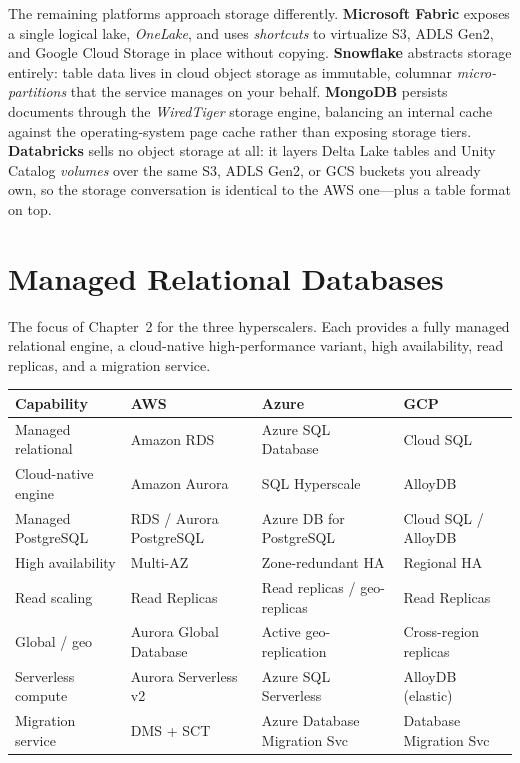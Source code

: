 \noindent The remaining platforms approach storage differently.
\textbf{Microsoft Fabric} exposes a single logical lake, \emph{OneLake}, and uses
\emph{shortcuts} to virtualize S3, ADLS Gen2, and Google Cloud Storage in place without copying.
\textbf{Snowflake} abstracts storage entirely: table data lives in cloud object storage as
immutable, columnar \emph{micro-partitions} that the service manages on your behalf.
\textbf{MongoDB} persists documents through the \emph{WiredTiger} storage engine, balancing an
internal cache against the operating-system page cache rather than exposing storage tiers.
\textbf{Databricks} sells no object storage at all: it layers Delta Lake tables and Unity Catalog
\emph{volumes} over the same S3, ADLS Gen2, or GCS buckets you already own, so the storage
conversation is identical to the AWS one---plus a table format on top.

\section{Managed Relational Databases}
%
The focus of Chapter~2 for the three hyperscalers. Each provides a fully managed relational
engine, a cloud-native high-performance variant, high availability, read replicas, and a
migration service.

\begin{center}
\footnotesize
\begin{tabular}{@{}p{2.8cm}p{3.2cm}p{3.2cm}p{3.2cm}@{}}
\toprule
\textbf{Capability} & \textbf{AWS} & \textbf{Azure} & \textbf{GCP} \\
\midrule
Managed relational & Amazon RDS & Azure SQL Database & Cloud SQL \\
Cloud-native engine & Amazon Aurora & SQL Hyperscale & AlloyDB \\
Managed PostgreSQL & RDS / Aurora PostgreSQL & Azure DB for PostgreSQL & Cloud SQL / AlloyDB \\
High availability & Multi-AZ & Zone-redundant HA & Regional HA \\
Read scaling & Read Replicas & Read replicas / geo-replicas & Read Replicas \\
Global / geo & Aurora Global Database & Active geo-replication & Cross-region replicas \\
Serverless compute & Aurora Serverless v2 & Azure SQL Serverless & AlloyDB (elastic) \\
Migration service & DMS + SCT & Azure Database Migration Svc & Database Migration Svc \\
\bottomrule
\end{tabular}
\end{center}

